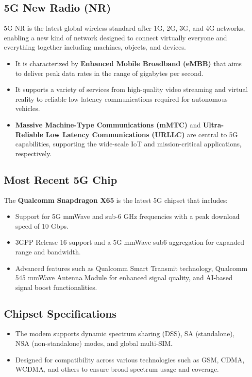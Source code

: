 \subsection*{5G New Radio (NR)}
5G NR is the latest global wireless standard after 1G, 2G, 3G, and 4G networks, enabling a new kind of network designed to connect virtually everyone and everything together including machines, objects, and devices.

\begin{itemize}
    \item It is characterized by \textbf{Enhanced Mobile Broadband (eMBB)} that aims to deliver peak data rates in the range of gigabytes per second.
    \item It supports a variety of services from high-quality video streaming and virtual reality to reliable low latency communications required for autonomous vehicles.
    \item \textbf{Massive Machine-Type Communications (mMTC)} and \textbf{Ultra-Reliable Low Latency Communications (URLLC)} are central to 5G capabilities, supporting the wide-scale IoT and mission-critical applications, respectively.
\end{itemize}

\subsection*{Most Recent 5G Chip}
The \textbf{Qualcomm\textsuperscript{\textregistered} Snapdragon X65} is the latest 5G chipset that includes:
\begin{itemize}
    \item Support for 5G mmWave and sub-6 GHz frequencies with a peak download speed of 10 Gbps.
    \item 3GPP Release 16 support and a 5G mmWave-sub6 aggregation for expanded range and bandwidth.
    \item Advanced features such as Qualcomm\textsuperscript{\textregistered} Smart Transmit technology, Qualcomm\textsuperscript{\textregistered} 545 mmWave Antenna Module for enhanced signal quality, and AI-based signal boost functionalities.
\end{itemize}

\subsection*{Chipset Specifications}
\begin{itemize}
    \item The modem supports dynamic spectrum sharing (DSS), SA (standalone), NSA (non-standalone) modes, and global multi-SIM.
    \item Designed for compatibility across various technologies such as GSM, CDMA, WCDMA, and others to ensure broad spectrum usage and coverage.
\end{itemize}

